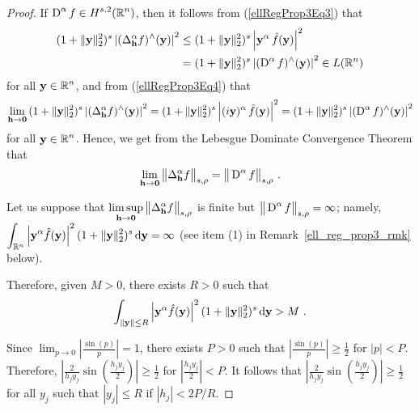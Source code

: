 \begin{proof}
 If $\displaystyle \operatorname{D}^\alpha f \in H^{s,2}(\mathbb{R}^n)$, then
it follows from (\ref{ellRegProp3Eq3}) that
\begin{equation} \label{ellRegProp3Eq5}
\begin{split}
(1+\|\mathbf{y}\|_2^2)^s
\left| (\Delta^\alpha_{\mathbf{h}} f)^\wedge (\mathbf{y}) \right|^2
&\leq (1+\|\mathbf{y}\|_2^2)^s
\left| \mathbf{y}^\alpha \,\hat{f}(\mathbf{y})\right|^2 \\
&= (1+\|\mathbf{y}\|_2^2)^s \left| (\operatorname{D}^\alpha f)^\wedge(\mathbf{y})\right|^2
\in L(\mathbb{R}^n)
\end{split}
\end{equation}
for all $\displaystyle \mathbf{y} \in \mathbb{R}^n$, and from (\ref{ellRegProp3Eq4}) that
\[
\lim_{\mathbf{h}\to \mathbf{0}} \, (1+\|\mathbf{y}\|_2^2)^s
\left|(\Delta^\alpha_{\mathbf{h}} f)^\wedge(\mathbf{y})\right|^2
= (1+\|\mathbf{y}\|_2^2)^s \left|(i \mathbf{y})^\alpha \,\hat{f}(\mathbf{y})\right|^2
= (1+\|\mathbf{y}\|_2^2)^s \left| (\operatorname{D}^\alpha f)^\wedge(\mathbf{y})\right|^2
\]
for all $\displaystyle \mathbf{y} \in \mathbb{R}^n$.  Hence, we get from the Lebesgue
Dominate Convergence Theorem that
\[
\lim_{\mathbf{h}\rightarrow \mathbf{0}} \big\|\Delta^\alpha_{\mathbf{h}} f\big\|_{s,\rho}
= \big\|\operatorname{D}^\alpha f\big\|_{s,\rho} \ .
\]

 Let us suppose that
$\displaystyle \limsup_{\mathbf{h}\rightarrow \mathbf{0}}
\big\|\Delta^\alpha_{\mathbf{h}} f\big\|_{s,\rho}$ is finite but
$\big\|\operatorname{D}^\alpha f\big\|_{s,\rho} = \infty$; namely,\\
$\displaystyle \int_{\mathbb{R}^n} \left| \mathbf{y}^\alpha \hat{f}(\mathbf{y})\right|^2
(1 + \|\mathbf{y}\|_2^2)^s \,\mathrm{d}{\mathbf{y}} = \infty$ (see item (1) in
Remark~\ref{ell_reg_prop3_rmk} below).

Therefore, given $M>0$, there exists $R>0$ such that
\[
\int_{\|\mathbf{y}\|\leq R} \left| \mathbf{y}^\alpha\hat{f}(\mathbf{y})\right|^2
(1+\|\mathbf{y}\|_2^2)^s \,\mathrm{d}{\mathbf{y}} > M \ .
\]

Since $\displaystyle \lim_{p \to 0}\left|\frac{\sin(p)}{p}\right| = 1$, 
there exists $P>0$ such that
$\displaystyle \left|\frac{\sin(p)}{p}\right| \geq \frac{1}{2}$
for $|p|<P$.  Therefore,
$\displaystyle \left| \frac{2}{h_jy_j} \sin\left(\frac{h_j y_j}{2}\right)\right|
\geq \frac{1}{2}$ for $\displaystyle \left|\frac{h_jy_j}{2}\right|<P$.
It follows that
$\displaystyle \left| \frac{2}{h_jy_j} \sin\left(\frac{h_j y_j}{2}\right)\right|
\geq \frac{1}{2}$ for all $y_j$ such that $|y_j| \leq R$ if
$\displaystyle |h_j| < 2P/R$.


\end{proof}
